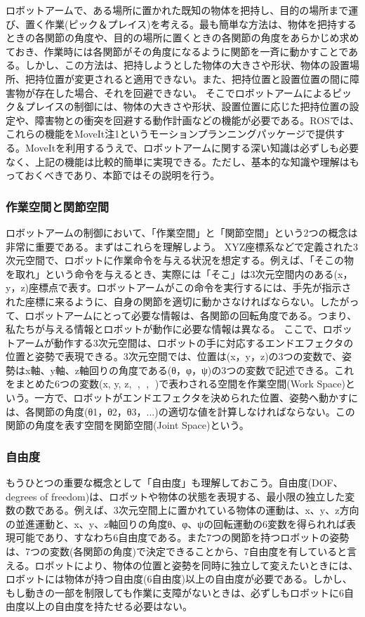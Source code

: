 ロボットアームで、ある場所に置かれた既知の物体を把持し、目的の場所まで運び、置く作業(ピック＆プレイス)を考える。最も簡単な方法は、物体を把持するときの各関節の角度や、目的の場所に置くときの各関節の角度をあらかじめ求めておき、作業時には各関節がその角度になるように関節を一斉に動かすことである。しかし、この方法は、把持しようとした物体の大きさや形状、物体の設置場所、把持位置が変更されると適用できない。また、把持位置と設置位置の間に障害物が存在した場合、それを回避できない。
そこでロボットアームによるピック＆プレイスの制御には、物体の大きさや形状、設置位置に応じた把持位置の設定や、障害物との衝突を回避する動作計画などの機能が必要である。ROSでは、これらの機能をMoveIt注1というモーションプランニングパッケージで提供する。MoveItを利用するうえで、ロボットアームに関する深い知識は必ずしも必要なく、上記の機能は比較的簡単に実現できる。ただし、基本的な知識や理解はもっておくべきであり、本節ではその説明を行う。

\subsubsection{作業空間と関節空間}

ロボットアームの制御において、「作業空間」と「関節空間」という2つの概念は非常に重要である。まずはこれらを理解しよう。
XYZ座標系などで定義された3次元空間で、ロボットに作業命令を与える状況を想定する。例えば、「そこの物を取れ」という命令を与えるとき、実際には「そこ」は3次元空間内のある(x，y，z)座標点で表す。ロボットアームがこの命令を実行するには、手先が指示された座標に来るように、自身の関節を適切に動かさなければならない。したがって、ロボットアームにとって必要な情報は、各関節の回転角度である。つまり、私たちが与える情報とロボットが動作に必要な情報は異なる。
ここで、ロボットアームが動作する3次元空間は、ロボットの手に対応するエンドエフェクタの位置と姿勢で表現できる。3次元空間では、位置は(x，y，z)の3つの変数で、姿勢はx軸、y軸、z軸回りの角度である(θ，φ，ψ)の3つの変数で記述できる。これをまとめた6つの変数(x, y, z, , , )で表わされる空間を作業空間(Work Space)という。一方で、ロボットがエンドエフェクタを決められた位置、姿勢へ動かすには、各関節の角度(θ1，θ2，θ3，...)の適切な値を計算しなければならない。この関節の角度を表す空間を関節空間(Joint Space)という。

\subsubsection{自由度}

もうひとつの重要な概念として「自由度」も理解しておこう。自由度(DOF、degrees of freedom)は、ロボットや物体の状態を表現する、最小限の独立した変数の数である。例えば、3次元空間上に置かれている物体の運動は、x、y、z方向の並進運動と、x、y、z軸回りの角度θ、φ、ψの回転運動の6変数を得られれば表現可能であり、すなわち6自由度である。また7つの関節を持つロボットの姿勢は、7つの変数(各関節の角度)で決定できることから、7自由度を有していると言える。ロボットにより、物体の位置と姿勢を同時に独立して変えたいときには、ロボットには物体が持つ自由度(6自由度)以上の自由度が必要である。しかし、もし動きの一部を制限しても作業に支障がないときは、必ずしもロボットに6自由度以上の自由度を持たせる必要はない。

